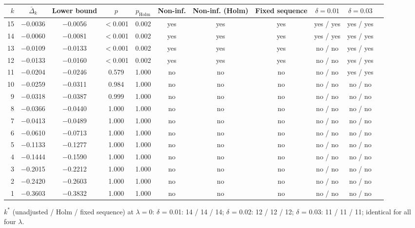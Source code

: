 \begin{table}[htbp]
\centering
\small
\caption{}
\label{tab:h1_holm}
\setlength{\tabcolsep}{4pt}
\begin{adjustbox}{max width=\textwidth}
\begin{tabular}{rcccccccccc}
\toprule
$k$ & $\bar\Delta_k$ & Lower bound & $p$ & $p_{\mathrm{Holm}}$ & Non-inf. & Non-inf. (Holm) & Fixed sequence & $\delta = 0.01$ & $\delta = 0.03$ \\
\midrule
15 & $-$0.0036 & $-$0.0056 & $<$0.001 & 0.002 & yes & yes & yes & yes / yes & yes / yes \\
14 & $-$0.0060 & $-$0.0081 & $<$0.001 & 0.002 & yes & yes & yes & yes / yes & yes / yes \\
13 & $-$0.0109 & $-$0.0133 & $<$0.001 & 0.002 & yes & yes & yes & no / no & yes / yes \\
12 & $-$0.0133 & $-$0.0160 & $<$0.001 & 0.002 & yes & yes & yes & no / no & yes / yes \\
11 & $-$0.0204 & $-$0.0246 & 0.579 & 1.000 & no & no & no & no / no & yes / yes \\
10 & $-$0.0259 & $-$0.0311 & 0.984 & 1.000 & no & no & no & no / no & no / no \\
9 & $-$0.0318 & $-$0.0387 & 0.999 & 1.000 & no & no & no & no / no & no / no \\
8 & $-$0.0366 & $-$0.0440 & 1.000 & 1.000 & no & no & no & no / no & no / no \\
7 & $-$0.0413 & $-$0.0489 & 1.000 & 1.000 & no & no & no & no / no & no / no \\
6 & $-$0.0610 & $-$0.0713 & 1.000 & 1.000 & no & no & no & no / no & no / no \\
5 & $-$0.1133 & $-$0.1277 & 1.000 & 1.000 & no & no & no & no / no & no / no \\
4 & $-$0.1444 & $-$0.1590 & 1.000 & 1.000 & no & no & no & no / no & no / no \\
3 & $-$0.2015 & $-$0.2212 & 1.000 & 1.000 & no & no & no & no / no & no / no \\
2 & $-$0.2420 & $-$0.2603 & 1.000 & 1.000 & no & no & no & no / no & no / no \\
1 & $-$0.3603 & $-$0.3832 & 1.000 & 1.000 & no & no & no & no / no & no / no \\
\bottomrule
\end{tabular}
\end{adjustbox}
\par\smallskip\parbox{0.95\linewidth}{\footnotesize $k^*$ (unadjusted / Holm / fixed sequence) at $\lambda = 0$: $\delta$ = 0.01: 14 / 14 / 14; $\delta$ = 0.02: 12 / 12 / 12; $\delta$ = 0.03: 11 / 11 / 11; identical for all four $\lambda$.}
\end{table}
